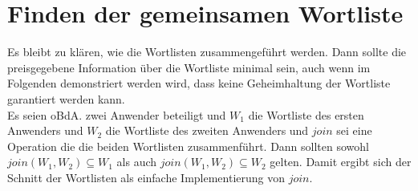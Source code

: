 \documentclass{article}
\begin{document}
\section{Finden der gemeinsamen Wortliste}
  Es bleibt zu kl\"aren, wie die Wortlisten zusammengef\"uhrt werden. 
  Dann sollte die preisgegebene Information \"uber die Wortliste minimal
sein, auch wenn im Folgenden demonstriert werden wird, dass keine
Geheimhaltung der Wortliste garantiert werden kann.\\
  Es seien oBdA. zwei Anwender beteiligt und \(W_1\) die Wortliste des
ersten Anwenders und \(W_2\) die Wortliste des zweiten Anwenders und 
\(join\) sei eine Operation die die beiden Wortlisten zusammenf\"uhrt.
  Dann sollten sowohl \(join(W_1, W_2) \subseteq W_1\) als auch
\(join(W_1, W_2) \subseteq W_2\) gelten.
  Damit ergibt sich der Schnitt der Wortlisten als einfache Implementierung
von \(join\).
\end{document}
